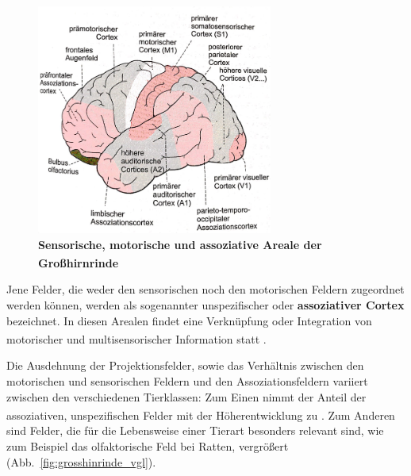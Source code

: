 \documentclass[12pt,a4paper,pdftex]{article}
\begin{document}
\begin{figure}[H]
    \centering
    \includegraphics[width=0.69\textwidth]{pictures/Bilder_Jule/Andere/Grosshirnrinde_sensorik_motorik.png}
    \caption[Sensorische, motorische und assoziative Areale der Großhirnrinde]{\textbf{Sensorische, motorische und assoziative Areale der Großhirnrinde} \textsuperscript{\cite[14]{penzlin2005tierphys}}}
    \label{fig:grosshirnrinde_sensorik_motorik}
\end{figure}

\noindent Jene Felder, die weder den sensorischen noch den motorischen Feldern zugeordnet werden können, werden als sogenannter unspezifischer oder \textbf{assoziativer Cortex} bezeichnet. In diesen Arealen findet eine Verknüpfung oder Integration von motorischer und multisensorischer Information statt \textsuperscript{\cite[14]{penzlin2005tierphys}}. 

\noindent Die Ausdehnung der Projektionsfelder, sowie das Verhältnis zwischen den motorischen und sensorischen Feldern und den Assoziationsfeldern variiert zwischen den verschiedenen Tierklassen: Zum Einen nimmt der Anteil der assoziativen, unspezifischen Felder mit der Höherentwicklung zu \textsuperscript{\cite[14]{penzlin2005tierphys}}. Zum Anderen sind Felder, die für die Lebensweise einer Tierart besonders relevant sind, wie zum Beispiel das olfaktorische Feld bei Ratten, vergrößert (Abb.~\ref{fig:grosshinrinde_vgl}).
\end{document}
